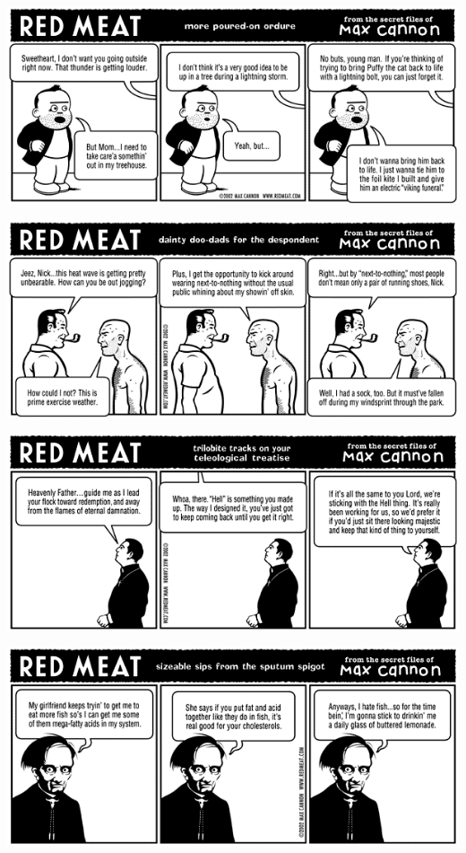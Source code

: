 \documentclass[a4paper,twoside,11pt]{article}
\begin{document}
\includegraphics[width=\textwidth]{redmeat_2002-03-19.png}



\includegraphics[width=\textwidth]{redmeat_2002-03-26.png}



\includegraphics[width=\textwidth]{redmeat_2002-04-02.png}



\includegraphics[width=\textwidth]{redmeat_2002-04-09.png}
\end{document}
